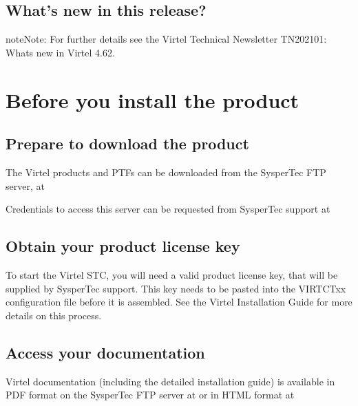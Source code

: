\documentclass[letterpaper,10pt,english]{sphinxmanual}
\begin{document}
\section{What’s new in this release?}
\label{\detokenize{Getting_Started:what-s-new-in-this-release}}
\begin{sphinxadmonition}{note}{Note:}
\sphinxAtStartPar
For further details see the Virtel Technical Newsletter TN202101: Whats new in Virtel 4.62.
\end{sphinxadmonition}


\chapter{Before you install the product}
\label{\detokenize{Getting_Started:before-you-install-the-product}}

\section{Prepare to download the product}
\label{\detokenize{Getting_Started:prepare-to-download-the-product}}
\sphinxAtStartPar
The Virtel products and PTFs can be downloaded from the SysperTec FTP server, at 

\sphinxAtStartPar
Credentials to access this server can be requested from SysperTec support at 


\section{Obtain your product license key}
\label{\detokenize{Getting_Started:obtain-your-product-license-key}}
\sphinxAtStartPar
To start the Virtel STC, you will need a valid product license key, that will be supplied by SysperTec support. This key needs to be pasted into the VIRTCTxx configuration file before it is assembled. See the Virtel Installation Guide for more details on this process.


\section{Access your documentation}
\label{\detokenize{Getting_Started:access-your-documentation}}
\sphinxAtStartPar
Virtel documentation (including the detailed installation guide) is available in PDF format on the SysperTec FTP server at  or in HTML format at 
\end{document}
